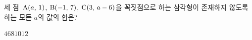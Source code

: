 세 점~$\mathrm{A}(a,\mkern3mu 1)$, $\mathrm{B}(-1,\mkern3mu 7)$, $\mathrm{C}(3,\mkern3mu a-6)$을 꼭짓점으로 하는 삼각형이 존재하지 않도록 하는 모든 $a$의 값의 합은?
\begin{choices32}{$4$}{$6$}{$8$}{$10$}{$12$}\end{choices32}
